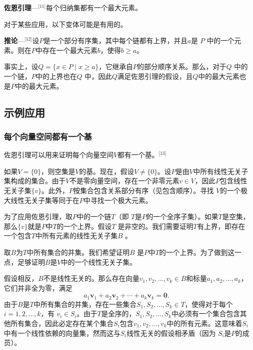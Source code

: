 \textbf{佐恩引理}—\(^\text{[11]}\)每个归纳集都有一个最大元素。

对于某些应用，以下变体可能是有用的。

\textbf{推论}—\(^\text{[12]}\)设\( P \)是一个部分有序集，其中每个链都有上界，并且\( a \)是 \( P \) 中的一个元素。则在\( P \)中存在一个最大元素\( b \)，使得\( b \geq a \)。

事实上，设\( Q = \{x \in P \mid x \geq a\} \)，它继承自\( P \)的部分顺序关系。那么，对于\( Q \) 中的一个链，\( P \)中的上界也在\( Q \) 中，因此\( Q \)满足佐恩引理的假设，且\( Q \)中的最大元素也是\( P \)中的最大元素。
\subsection{示例应用}  
\subsubsection{每个向量空间都有一个基} 
佐恩引理可以用来证明每个向量空间\( V \)都有一个基。\(^\text{[13]}\)

如果\( V = \{0\} \)，则空集是\( V \)的基。现在，假设\( V \neq \{0\} \)。设\( P \)是由\( V \)中所有线性无关子集构成的集合。由于\( V \)不是零向量空间，存在一个非零元素\( v \in V \)，因此\( P \)包含线性无关子集\( \{v\} \)。此外，\( P \)按集合包含关系部分有序（见包含顺序）。寻找 \( V \)的一个极大线性无关子集等同于在\( P \)中寻找一个极大元素。

为了应用佐恩引理，取\( P \)中的一个链\( T \)（即 \( T \)是\( P \)的一个全序子集）。如果\( T \)是空集，那么\( \{v\} \)就是\( P \)中\( T \)的一个上界。假设\( T \) 是非空的。我们需要证明\( T \)有上界，即存在一个包含\( T \)中所有元素的线性无关子集\( B \) 。

取\( B \)为\( T \)中所有集合的并集。我们希望证明\( B \) 是\( P \)中\( T \)的一个上界。为了做到这一点，足够证明\( B \)是\( V \)中的一个线性无关子集。

假设相反，\( B \)不是线性无关的。那么存在向量\( v_1, v_2, \dots, v_k \in B \)和标量\( a_1, a_2, \dots, a_k \)，它们并非全为零，满足
\[
a_1 \mathbf{v}_1 + a_2 \mathbf{v}_2 + \cdots + a_k \mathbf{v}_k = \mathbf{0}.~
\]
由于\( B \)是\( T \)中所有集合的并集，存在一些集合\( S_1, S_2, \dots, S_k \in T \)，使得对于每个\( i = 1, 2, \dots, k \)，有 \( v_i \in S_i \)。由于\( T \)是全序的，\( S_1, S_2, \dots, S_k \)中必须有一个集合包含其他所有集合，因此必定存在某个集合\( S_i \)包含\( v_1, v_2, \dots, v_k \)中的所有元素。这意味着\( S_i \)中有一个线性依赖的向量集，然而这与\( S_i \)线性无关的假设相矛盾（因为 \( S_i \)是\( P \)的成员）。

